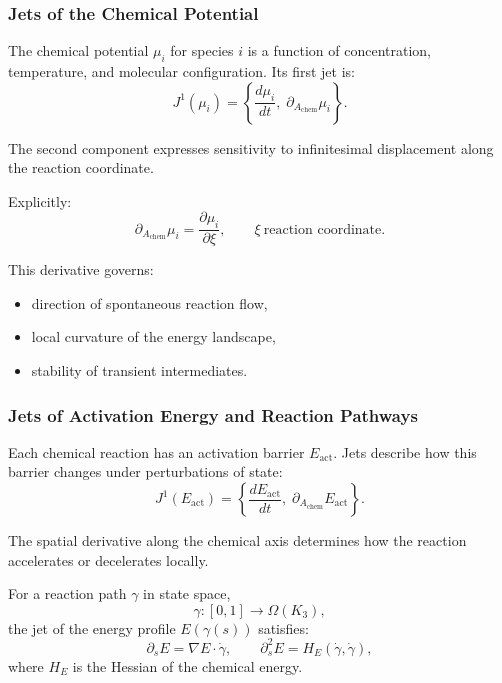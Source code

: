 \subsubsection{Jets of the Chemical Potential}

The chemical potential $\mu_i$ for species $i$ is a function of
concentration, temperature, and molecular configuration. Its first jet is:
\[
J^1(\mu_i) =
\left\{
\frac{d\mu_i}{dt},\;
\partial_{A_{\mathrm{chem}}}\mu_i
\right\}.
\]

The second component expresses sensitivity to infinitesimal displacement
along the reaction coordinate.

Explicitly:
\[
\partial_{A_{\mathrm{chem}}}\mu_i
=
\frac{\partial \mu_i}{\partial \xi},
\qquad
\xi\ \text{reaction coordinate}.
\]

This derivative governs:

\begin{itemize}
    \item direction of spontaneous reaction flow,
    \item local curvature of the energy landscape,
    \item stability of transient intermediates.
\end{itemize}



\subsubsection{Jets of Activation Energy and Reaction Pathways}

Each chemical reaction has an activation barrier $E_{\mathrm{act}}$.
Jets describe how this barrier changes under perturbations of state:
\[
J^1(E_{\mathrm{act}}) =
\left\{
\frac{dE_{\mathrm{act}}}{dt},\;
\partial_{A_{\mathrm{chem}}}E_{\mathrm{act}}
\right\}.
\]

The spatial derivative along the chemical axis determines how the
reaction accelerates or decelerates locally.

For a reaction path $\gamma$ in state space,
\[
\gamma: [0,1] \to \Omega(K_3),
\]
the jet of the energy profile $E(\gamma(s))$ satisfies:
\[
\partial_s E = \nabla E \cdot \dot{\gamma},
\qquad
\partial_s^2 E = H_E(\dot{\gamma},\dot{\gamma}),
\]
where $H_E$ is the Hessian of the chemical energy.


